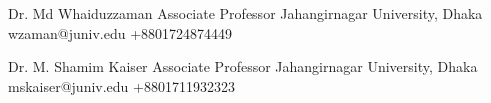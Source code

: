 

\cvref
{Dr. Md Whaiduzzaman}
{Associate Professor}
{Jahangirnagar University, Dhaka}
{wzaman@juniv.edu}
{+8801724874449}

\divider

\cvref
{Dr. M. Shamim Kaiser}
{Associate Professor}
{Jahangirnagar University, Dhaka}
{mskaiser@juniv.edu}
{+8801711932323}

